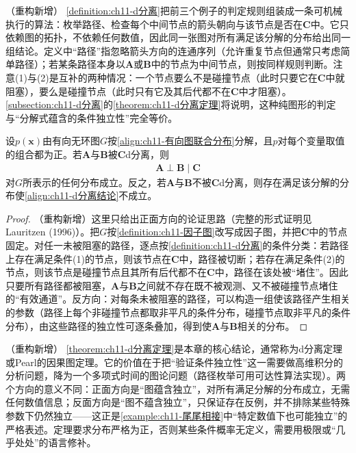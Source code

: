 \documentclass[../../main.tex]{subfiles}
\begin{document}
\begin{remark}（重构新增）
\cref{definition:ch11-d分离}把前三个例子的判定规则组装成一条可机械执行的算法：枚举路径、检查每个中间节点的箭头朝向与该节点是否在$\mathbf{C}$中。它只依赖图的拓扑，不依赖任何数值，因此同一张图对所有满足该分解的分布给出同一组结论。定义中“路径”指忽略箭头方向的连通序列（允许重复节点但通常只考虑简单路径）；若某条路径本身以$\mathbf{A}$或$\mathbf{B}$中的节点为中间节点，则按同样规则判断。注意(1)与(2)是互补的两种情况：一个节点要么不是碰撞节点（此时只要它在$\mathbf{C}$中就阻塞），要么是碰撞节点（此时只有它及其后代都不在$\mathbf{C}$中才阻塞）。\cref{subsection:ch11-d分离}的\cref{theorem:ch11-d分离定理}将说明，这种纯图形的判定与“分解式蕴含的条件独立性”完全等价。
\end{remark}

\begin{theorem}[d分离判定]\label{theorem:ch11-d分离定理}
设$p(\mathbf{x})$由有向无环图$G$按\eqref{align:ch11-有向图联合分布}分解，且$p$对每个变量取值的组合都为正。若$\mathbf{A}$与$\mathbf{B}$被$\mathbf{C}$d分离，则
\begin{align}
  \mathbf{A}\perp\mathbf{B}\mid\mathbf{C}
  \label{align:ch11-d分离结论}
\end{align}
对$G$所表示的任何分布成立。反之，若$\mathbf{A}$与$\mathbf{B}$不被$\mathbf{C}$d分离，则存在满足该分解的分布使\eqref{align:ch11-d分离结论}不成立。
\end{theorem}

\begin{proof}
（重构新增）这里只给出正面方向的论证思路（完整的形式证明见 Lauritzen (1996)）。把$G$按\cref{definition:ch11-因子图}改写成因子图，并把$\mathbf{C}$中的节点固定。对任一未被阻塞的路径，逐点按\cref{definition:ch11-d分离}的条件分类：若路径上存在满足条件(1)的节点，则该节点在$\mathbf{C}$中，路径被切断；若存在满足条件(2)的节点，则该节点是碰撞节点且其所有后代都不在$\mathbf{C}$中，路径在该处被“堵住”。因此只要所有路径都被阻塞，$\mathbf{A}$与$\mathbf{B}$之间就不存在既不被观测、又不被碰撞节点堵住的“有效通道”。反方向：对每条未被阻塞的路径，可以构造一组使该路径产生相关的参数（路径上每个非碰撞节点都取非平凡的条件分布，碰撞节点取非平凡的条件分布），由这些路径的独立性可逐条叠加，得到使$\mathbf{A}$与$\mathbf{B}$相关的分布。
\end{proof}

\begin{remark}（重构新增）
\cref{theorem:ch11-d分离定理}是本章的核心结论，通常称为d分离定理或Pearl的因果图定理。它的价值在于把“验证条件独立性”这一需要做高维积分的分析问题，降为一个多项式时间的图论问题（路径枚举可用可达性算法实现）。两个方向的意义不同：正面方向是“图蕴含独立”，对所有满足分解的分布成立，无需任何数值信息；反面方向是“图不蕴含独立”，只保证存在反例，并不排除某些特殊参数下仍然独立——这正是\cref{example:ch11-尾尾相接}中“特定数值下也可能独立”的严格表述。定理要求分布严格为正，否则某些条件概率无定义，需要用极限或“几乎处处”的语言修补。
\end{remark}
\end{document}
